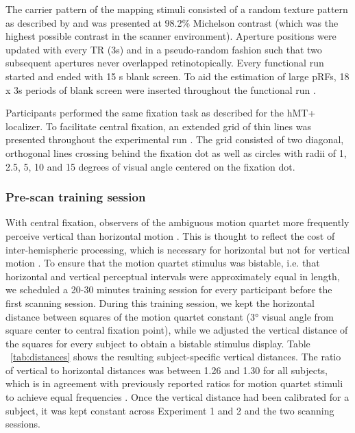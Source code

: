 The carrier pattern of the mapping stimuli consisted of a random texture pattern as described by \cite{Kolster2010} and was presented at 98.2\% Michelson contrast (which was the highest possible contrast in the scanner environment). Aperture positions were updated with every TR (3s) and in a pseudo-random fashion such that two subsequent apertures never overlapped retinotopically. Every functional run started and ended with 15 s blank screen. To aid the estimation of large pRFs, 18 x 3s periods of blank screen were inserted throughout the functional run \parencite{Amano2009}.

Participants performed the same fixation task as described for the hMT+ localizer. To facilitate central fixation, an extended grid of thin lines was presented throughout the experimental run \parencite{Tyler2005}. The grid consisted of two diagonal, orthogonal lines crossing behind the fixation dot as well as circles with radii of 1, 2.5, 5, 10 and 15 degrees of visual angle centered on the fixation dot.

\subsubsection{Pre-scan training session}
With central fixation, observers of the ambiguous motion quartet more frequently perceive vertical than horizontal motion \parencite{Glaser1991}. This is thought to reflect the cost of inter-hemispheric processing, which is necessary for horizontal but not for vertical motion \parencite{Glaser1991, Gen2011}. To ensure that the motion quartet stimulus was bistable, i.e. that horizontal and vertical perceptual intervals were approximately equal in length, we scheduled a 20-30 minutes training session for every participant before the first scanning session. During this training session, we kept the horizontal distance between squares of the motion quartet constant (3° visual angle from square center to central fixation point), while we adjusted the vertical distance of the squares for every subject to obtain a bistable stimulus display. Table ~\ref{tab:distances} shows the resulting subject-specific vertical distances. The ratio of vertical to horizontal distances was between 1.26 and 1.30 for all subjects, which is in agreement with previously reported ratios for motion quartet stimuli to achieve equal frequencies \parencite{Glaser1991}. Once the vertical distance had been calibrated for a subject, it was kept constant across Experiment 1 and 2 and the two scanning sessions.

